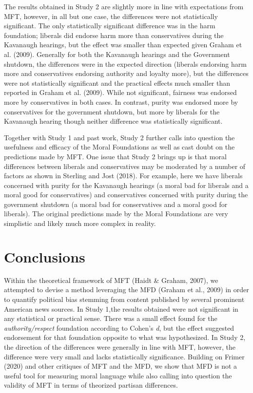 \documentclass[
  man,floatsintext]{apa6}
\begin{document}
The results obtained in Study 2 are slightly more in line with expectations from MFT, however, in all but one case, the differences were not statistically significant. The only statistically significant difference was in the harm foundation; liberals did endorse harm more than conservatives during the Kavanaugh hearings, but the effect was smaller than expected given Graham et al. (2009). Generally for both the Kavanaugh hearings and the Government shutdown, the differences were in the expected direction (liberals endorsing harm more and conservatives endorsing authority and loyalty more), but the differences were not statistically significant and the practical effects much smaller than reported in Graham et al. (2009). While not significant, fairness was endorsed more by conservatives in both cases. In contrast, purity was endorsed more by conservatives for the government shutdown, but more by liberals for the Kavanaugh hearing though neither difference was statistically significant.

Together with Study 1 and past work, Study 2 further calls into question the usefulness and efficacy of the Moral Foundations as well as cast doubt on the predictions made by MFT. One issue that Study 2 brings up is that moral differences between liberals and conservatives may be moderated by a number of factors as shown in Sterling and Jost (2018). For example, here we have liberals concerned with purity for the Kavanaugh hearings (a moral bad for liberals and a moral good for conservatives) and conservatives concerned with purity during the government shutdown (a moral bad for conservatives and a moral good for liberals). The original predictions made by the Moral Foundations are very simplistic and likely much more complex in reality.

\hypertarget{conclusions}{%
\section{Conclusions}\label{conclusions}}

Within the theoretical framework of MFT (Haidt \& Graham, 2007), we attempted to devise a method leveraging the MFD (Graham et al., 2009) in order to quantify political bias stemming from content published by several prominent American news sources. In Study 1,the results obtained were not significant in any statistical or practical sense. There was a small effect found for the \emph{authority/respect} foundation according to Cohen's \emph{d}, but the effect suggested endorsement for that foundation opposite to what was hypothesized. In Study 2, the direction of the differences were generally in line with MFT, however, the difference were very small and lacks statistically significance. Building on Frimer (2020) and other critiques of MFT and the MFD, we show that MFD is not a useful tool for measuring moral language while also calling into question the validity of MFT in terms of theorized partisan differences.
\end{document}
